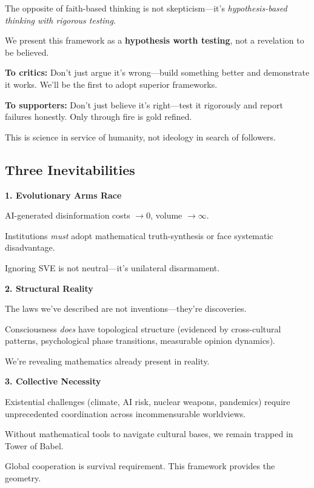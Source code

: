 \documentclass[11pt,a4paper]{article}
\theoremstyle{definition}
\theoremstyle{remark}
\begin{document}
\begin{small}
\begin{mdframed}[backgroundcolor=cyan!5]
The opposite of faith-based thinking is not skepticism—it's \textit{hypothesis-based thinking with rigorous testing}.

We present this framework as a \textbf{hypothesis worth testing}, not a revelation to be believed.

\textbf{To critics:} Don't just argue it's wrong—build something better and demonstrate it works. We'll be the first to adopt superior frameworks.

\textbf{To supporters:} Don't just believe it's right—test it rigorously and report failures honestly. Only through fire is gold refined.

This is science in service of humanity, not ideology in search of followers.
\end{mdframed}

\subsection{Three Inevitabilities}

\begin{mdframed}[backgroundcolor=blue!10]
\textbf{1. Evolutionary Arms Race}

AI-generated disinformation costs $\to 0$, volume $\to \infty$.

Institutions \textit{must} adopt mathematical truth-synthesis or face systematic disadvantage.

Ignoring SVE is not neutral—it's unilateral disarmament.

\textbf{2. Structural Reality}

The laws we've described are not inventions—they're discoveries.

Consciousness \textit{does} have topological structure (evidenced by cross-cultural patterns, psychological phase transitions, measurable opinion dynamics).

We're revealing mathematics already present in reality.

\textbf{3. Collective Necessity}

Existential challenges (climate, AI risk, nuclear weapons, pandemics) require unprecedented coordination across incommensurable worldviews.

Without mathematical tools to navigate cultural bases, we remain trapped in Tower of Babel.

Global cooperation is survival requirement. This framework provides the geometry.
\end{mdframed}


\end{small}
\end{document}
